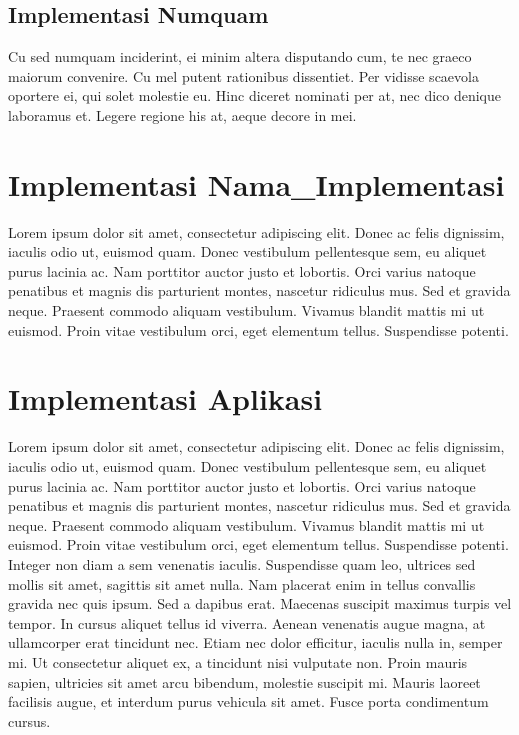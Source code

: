 \subsection{Implementasi Numquam}
Cu sed numquam inciderint, ei minim altera disputando cum, te nec graeco maiorum convenire.
Cu mel putent rationibus dissentiet. Per vidisse scaevola oportere ei, qui solet molestie eu. Hinc diceret nominati per at, nec dico denique laboramus et. Legere regione his at, aeque decore in mei.\\

\section{Implementasi Nama\_Implementasi}
Lorem ipsum dolor sit amet, consectetur adipiscing elit. Donec ac felis dignissim, iaculis odio ut, euismod quam. Donec vestibulum pellentesque sem, eu aliquet purus lacinia ac. Nam porttitor auctor justo et lobortis. Orci varius natoque penatibus et magnis dis parturient montes, nascetur ridiculus mus. Sed et gravida neque. Praesent commodo aliquam vestibulum. Vivamus blandit mattis mi ut euismod. Proin vitae vestibulum orci, eget elementum tellus. Suspendisse potenti.\\

\section{Implementasi Aplikasi}
Lorem ipsum dolor sit amet, consectetur adipiscing elit. Donec ac felis dignissim, iaculis odio ut, euismod quam. Donec vestibulum pellentesque sem, eu aliquet purus lacinia ac. Nam porttitor auctor justo et lobortis. Orci varius natoque penatibus et magnis dis parturient montes, nascetur ridiculus mus. Sed et gravida neque. Praesent commodo aliquam vestibulum. Vivamus blandit mattis mi ut euismod. Proin vitae vestibulum orci, eget elementum tellus. Suspendisse potenti.\\

Integer non diam a sem venenatis iaculis. Suspendisse quam leo, ultrices sed mollis sit amet, sagittis sit amet nulla. Nam placerat enim in tellus convallis gravida nec quis ipsum. Sed a dapibus erat. Maecenas suscipit maximus turpis vel tempor. In cursus aliquet tellus id viverra. Aenean venenatis augue magna, at ullamcorper erat tincidunt nec. Etiam nec dolor efficitur, iaculis nulla in, semper mi. Ut consectetur aliquet ex, a tincidunt nisi vulputate non. Proin mauris sapien, ultricies sit amet arcu bibendum, molestie suscipit mi. Mauris laoreet facilisis augue, et interdum purus vehicula sit amet. Fusce porta condimentum cursus.\\

